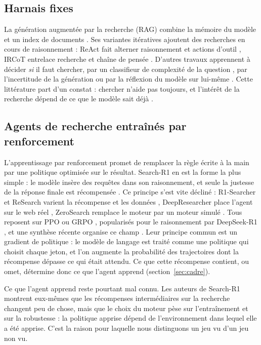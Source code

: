 \documentclass[11pt,a4paper]{article}
\begin{document}
\subsection{Harnais fixes}
La génération augmentée par la recherche (RAG) combine la mémoire du modèle et un index de documents \citep{lewis2020retrieval}. Ses variantes itératives ajoutent des recherches en cours de raisonnement : ReAct fait alterner raisonnement et actions d'outil \citep{yao2022react}, IRCoT entrelace recherche et chaîne de pensée \citep{trivedi2022interleaving}. D'autres travaux apprennent à décider \emph{si} il faut chercher, par un classifieur de complexité de la question \citep{jeong2024adaptive}, par l'incertitude de la génération \citep{jiang2023active,moskvoretskii2025adaptive} ou par la réflexion du modèle sur lui-même \citep{asai2023self}. Cette littérature part d'un constat : chercher n'aide pas toujours, et l'intérêt de la recherche dépend de ce que le modèle sait déjà \citep{mallen2022when,yin2023do}.

\subsection{Agents de recherche entraînés par renforcement}
L'apprentissage par renforcement promet de remplacer la règle écrite à la main par une politique optimisée sur le résultat. Search-R1 en est la forme la plus simple : le modèle insère des requêtes dans son raisonnement, et seule la justesse de la réponse finale est récompensée \citep{jin2025search}. Ce principe s'est vite décliné : R1-Searcher et ReSearch varient la récompense et les données \citep{song2025r1,chen2025research}, DeepResearcher place l'agent sur le web réel \citep{zheng2025deepresearcher}, ZeroSearch remplace le moteur par un moteur simulé \citep{sun2025zerosearch}. Tous reposent sur PPO \citep{schulman2017proximal} ou GRPO \citep{shao2024deepseekmath}, popularisés pour le raisonnement par DeepSeek-R1 \citep{deepseekai2025deepseek}, et une synthèse récente organise ce champ \citep{lin2025comprehensive}. Leur principe commun est un gradient de politique : le modèle de langage est traité comme une politique qui choisit chaque jeton, et l'on augmente la probabilité des trajectoires dont la récompense dépasse ce qui était attendu. Ce que cette récompense contient, ou omet, détermine donc ce que l'agent apprend (section~\ref{sec:cadre}).

Ce que l'agent apprend reste pourtant mal connu. Les auteurs de Search-R1 montrent eux-mêmes que les récompenses intermédiaires sur la recherche changent peu de chose, mais que le choix du moteur pèse sur l'entraînement et sur la robustesse \citep{jin2025empirical} : la politique apprise dépend de l'environnement dans lequel elle a été apprise. C'est la raison pour laquelle nous distinguons un jeu vu d'un jeu non vu.
\end{document}
